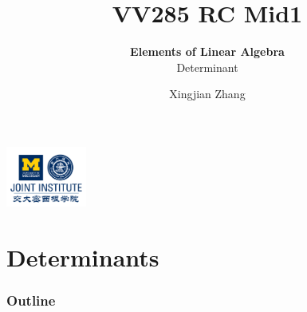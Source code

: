 \documentclass[12pt, t]{beamer}
\title{VV285 RC Mid1}
\subtitle{\textbf{Elements of Linear Algebra}\\\large Determinant}
\institute[UM-SJTU JI]{Univerity of Michigan-Shanghai Jiao Tong University Joint Institute}
\author{Xingjian Zhang}
\begin{document}
\begin{frame}
    \titlepage
    \begin{center}
        \includegraphics[height=2cm]{logo2.png}
    \end{center}
\end{frame}

\section{Determinants}
\begin{frame}
    \frametitle{Outline}
    \begin{spacing}{2.5}
        
        \tableofcontents[currentsubsection,hideothersubsections,sectionstyle=hide]        
    \end{spacing}
    

\end{frame}
\end{document}
